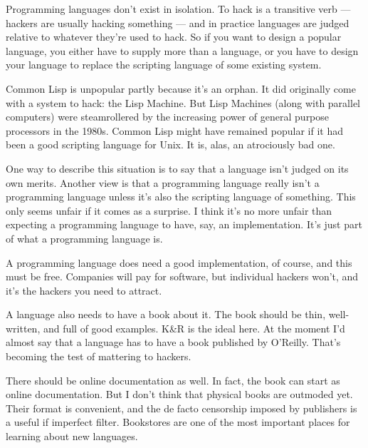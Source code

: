 Programming languages don't exist in
                  isolation. To hack is a transitive verb --- hackers are
                  usually hacking something --- and in practice languages
                  are judged relative to whatever they're used to hack. So if
                  you want to design a popular language, you either have to
                  supply more than a language, or you have to design your
                  language to replace the scripting language of some existing
                  system.

Common Lisp is unpopular partly because
                  it's an orphan. It did originally come with a system to hack:
                  the Lisp Machine. But Lisp Machines (along with parallel
                  computers) were steamrollered by the increasing power of
                  general purpose processors in the 1980s. Common Lisp might
                  have remained popular if it had been a good scripting language
                  for Unix. It is, alas, an atrociously bad one.

One
                  way to describe this situation is to say that a language isn't
                  judged on its own merits. Another view is that a programming
                  language really isn't a programming language unless it's also
                  the scripting language of something. This only seems unfair if
                  it comes as a surprise. I think it's no more unfair than
                  expecting a programming language to have, say, an
                  implementation. It's just part of what a programming language
                  is.

A programming language does need a good
                  implementation, of course, and this must be free. Companies
                  will pay for software, but individual hackers won't, and it's
                  the hackers you need to attract.

A language also
                  needs to have a book about it. The book should be thin,
                  well-written, and full of good examples. K\&R is the ideal
                  here. At the moment I'd almost say that a language has to have
                  a book published by O'Reilly. That's becoming the test of
                  mattering to hackers.

There should be online
                  documentation as well. In fact, the book can start as online
                  documentation. But I don't think that physical books are
                  outmoded yet. Their format is convenient, and the de facto
                  censorship imposed by publishers is a useful if imperfect
                  filter. Bookstores are one of the most important places for
                  learning about new languages.

